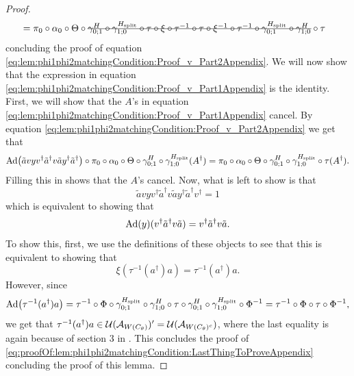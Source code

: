 \documentclass[11pt,a4paper,twoside]{article}
\numberwithin{equation}{section}
\begin{document}
\begin{proof}
\begin{align}
			&=\pi_0\circ\alpha_0\circ\Theta\circ\stkout{\gamma^{H}_{0;1}\circ\gamma^{\Hsplit}_{1;0}\circ\tau\circ\xi\circ\tau^{-1}\circ\tau\circ\xi^{-1}\circ\tau^{-1}\circ\gamma^{\Hsplit}_{0;1}\circ\gamma^H_{1;0}}\circ\tau
		\end{align}
		concluding the proof of equation \eqref{eq:lem:phi1phi2matchingCondition:Proof_v_Part2Appendix}. We will now show that the expression in equation \eqref{eq:lem:phi1phi2matchingCondition:Proof_v_Part1Appendix} is the identity. First, we will show that the $A$'s in equation \eqref{eq:lem:phi1phi2matchingCondition:Proof_v_Part1Appendix} cancel. By equation \eqref{eq:lem:phi1phi2matchingCondition:Proof_v_Part2Appendix} we get that
		\begin{equation}
			\Ad{\tilde{a}vyv^\dagger\tilde{a}^\dagger v\tilde{a}y^\dagger\tilde{a}^\dagger}\circ\pi_0\circ\alpha_0\circ\Theta\circ\gamma^{H}_{0;1}\circ\gamma^{\Hsplit}_{1;0}(A^\dagger)=\pi_0\circ\alpha_0\circ\Theta\circ\gamma^{H}_{0;1}\circ\gamma^{\Hsplit}_{1;0}\circ\tau(A^\dagger).
		\end{equation}
		Filling this in shows that the $A$'s cancel. Now, what is left to show is that
		\begin{equation}
			\tilde{a}vyv^\dagger\tilde{a}^\dagger v \tilde{a}y^\dagger\tilde{a}^\dagger  v^\dagger=1
		\end{equation}
		which is equivalent to showing that
		\begin{equation}
			\Ad{y}(v^\dagger \tilde{a}^\dagger v \tilde{a})=v^\dagger \tilde{a}^\dagger v \tilde{a}.
		\end{equation}
		To show this, first, we use the definitions of these objects to see that this is equivalent to showing that
		\begin{equation}\label{eq:proofOf:lem:phi1phi2matchingCondition:LastThingToProveAppendix}
			\xi(\tau^{-1}(a^\dagger)a)=\tau^{-1}(a^\dagger)a.
		\end{equation}
		However, since
		\begin{equation}
			\Ad{\tau^{-1}(a^\dagger)a}=\tau^{-1}\circ\Phi\circ\gamma^{\Hsplit}_{0;1}\circ\gamma^H_{1;0}\circ\tau\circ\gamma^H_{0;1}\circ\gamma^{\Hsplit}_{1;0}\circ\Phi^{-1}=\tau^{-1}\circ\Phi\circ\tau\circ\Phi^{-1},
		\end{equation}
		we get that $\tau^{-1}(a^\dagger)a\in\mathcal U(\mathcal A_{W(C_\theta)})'=\mathcal U(\mathcal A_{W(C_\theta)^c})$, where the last equality is again because of section 3 in \cite{NaScWe_2013}. This concludes the proof of \ref{eq:proofOf:lem:phi1phi2matchingCondition:LastThingToProveAppendix} concluding the proof of this lemma.
	\end{proof}
\end{document}
